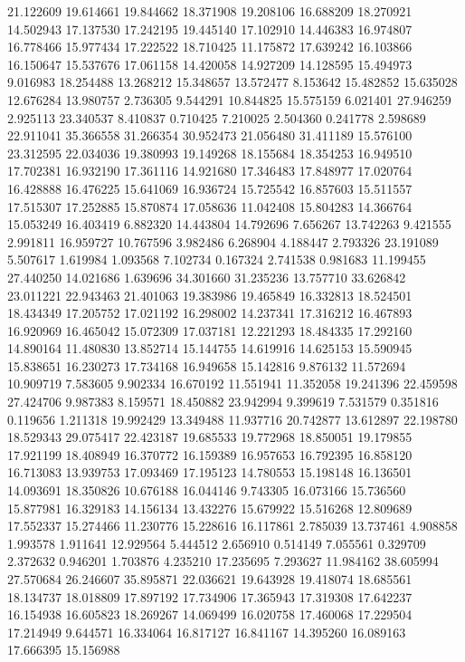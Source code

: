 21.122609
19.614661
19.844662
18.371908
19.208106
16.688209
18.270921
14.502943
17.137530
17.242195
19.445140
17.102910
14.446383
16.974807
16.778466
15.977434
17.222522
18.710425
11.175872
17.639242
16.103866
16.150647
15.537676
17.061158
14.420058
14.927209
14.128595
15.494973
9.016983
18.254488
13.268212
15.348657
13.572477
8.153642
15.482852
15.635028
12.676284
13.980757
2.736305
9.544291
10.844825
15.575159
6.021401
27.946259
2.925113
23.340537
8.410837
0.710425
7.210025
2.504360
0.241778
2.598689
22.911041
35.366558
31.266354
30.952473
21.056480
31.411189
15.576100
23.312595
22.034036
19.380993
19.149268
18.155684
18.354253
16.949510
17.702381
16.932190
17.361116
14.921680
17.346483
17.848977
17.020764
16.428888
16.476225
15.641069
16.936724
15.725542
16.857603
15.511557
17.515307
17.252885
15.870874
17.058636
11.042408
15.804283
14.366764
15.053249
16.403419
6.882320
14.443804
14.792696
7.656267
13.742263
9.421555
2.991811
16.959727
10.767596
3.982486
6.268904
4.188447
2.793326
23.191089
5.507617
1.619984
1.093568
7.102734
0.167324
2.741538
0.981683
11.199455
27.440250
14.021686
1.639696
34.301660
31.235236
13.757710
33.626842
23.011221
22.943463
21.401063
19.383986
19.465849
16.332813
18.524501
18.434349
17.205752
17.021192
16.298002
14.237341
17.316212
16.467893
16.920969
16.465042
15.072309
17.037181
12.221293
18.484335
17.292160
14.890164
11.480830
13.852714
15.144755
14.619916
14.625153
15.590945
15.838651
16.230273
17.734168
16.949658
15.142816
9.876132
11.572694
10.909719
7.583605
9.902334
16.670192
11.551941
11.352058
19.241396
22.459598
27.424706
9.987383
8.159571
18.450882
23.942994
9.399619
7.531579
0.351816
0.119656
1.211318
19.992429
13.349488
11.937716
20.742877
13.612897
22.198780
18.529343
29.075417
22.423187
19.685533
19.772968
18.850051
19.179855
17.921199
18.408949
16.370772
16.159389
16.957653
16.792395
16.858120
16.713083
13.939753
17.093469
17.195123
14.780553
15.198148
16.136501
14.093691
18.350826
10.676188
16.044146
9.743305
16.073166
15.736560
15.877981
16.329183
14.156134
13.432276
15.679922
15.516268
12.809689
17.552337
15.274466
11.230776
15.228616
16.117861
2.785039
13.737461
4.908858
1.993578
1.911641
12.929564
5.444512
2.656910
0.514149
7.055561
0.329709
2.372632
0.946201
1.703876
4.235210
17.235695
7.293627
11.984162
38.605994
27.570684
26.246607
35.895871
22.036621
19.643928
19.418074
18.685561
18.134737
18.018809
17.897192
17.734906
17.365943
17.319308
17.642237
16.154938
16.605823
18.269267
14.069499
16.020758
17.460068
17.229504
17.214949
9.644571
16.334064
16.817127
16.841167
14.395260
16.089163
17.666395
15.156988
